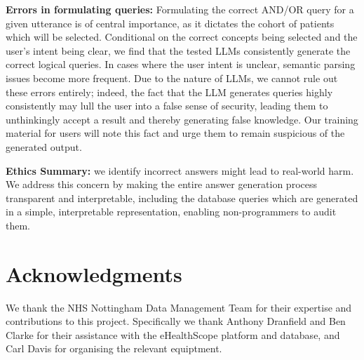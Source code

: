 \documentclass[11pt]{article}
\begin{document}
\textbf{Errors in formulating queries:}
Formulating the correct AND/OR query for a given utterance is of central importance, as it dictates the cohort of patients which will be selected.
Conditional on the correct concepts being selected and the user's intent being clear, we find that the tested LLMs consistently generate the correct logical queries.
In cases where the user intent is unclear, semantic parsing issues become more frequent. Due to the nature of LLMs, we cannot rule out these errors entirely; indeed, the fact that the LLM generates queries highly consistently may lull the user into a false sense of security, leading them to unthinkingly accept a result and thereby generating false knowledge. Our training material for users will note this fact and urge them to remain suspicious of the generated output.

\textbf{Ethics Summary:} we identify incorrect answers might lead to real-world harm. We address this concern by making the entire answer generation process transparent and interpretable, including the database queries which are generated in a simple, interpretable representation, enabling non-programmers to audit them.


\section*{Acknowledgments}
We thank the NHS Nottingham Data Management Team for their expertise and contributions to this project. Specifically we thank Anthony Dranfield and Ben Clarke for their assistance with the eHealthScope platform and database, and Carl Davis for organising the relevant equiptment.



\appendix

\end{document}
